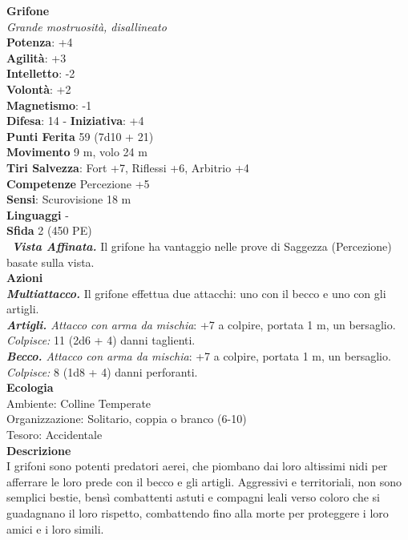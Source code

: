 \begin{multicols}{2}
\medskip\textbf{Grifone}\\
\emph{Grande mostruosità, disallineato}\\
\textbf{Potenza}: +4\\
\textbf{Agilità}: +3\\
\textbf{Intelletto}: -2\\
\textbf{Volontà}: +2\\
\textbf{Magnetismo}: -1\\
\textbf{Difesa}: 14 - \textbf{Iniziativa}: +4\\
\textbf{Punti Ferita} 59 (7d10 + 21)\\
\textbf{Movimento} 9 m, volo 24 m\\
\textbf{Tiri Salvezza}: Fort +7, Riflessi +6, Arbitrio +4\\
\textbf{Competenze} Percezione +5\\
\textbf{Sensi}: Scurovisione 18 m\\
\textbf{Linguaggi} -\\
\textbf{Sfida} 2 (450 PE)\smallskip\\\
\emph{\textbf{Vista Affinata.}} Il grifone ha vantaggio nelle prove di Saggezza (Percezione) basate sulla vista.\\
\smallskip\textbf{Azioni}\\
\emph{\textbf{Multiattacco.}} Il grifone effettua due attacchi: uno con il becco e uno con gli artigli.\\
\emph{\textbf{Artigli.} Attacco con arma da mischia}: +7 a colpire, portata 1 m, un bersaglio.\\
\emph{Colpisce:} 11 (2d6 + 4) danni taglienti.\\
\emph{\textbf{Becco.} Attacco con arma da mischia}: +7 a colpire, portata 1 m, un bersaglio.\\
\emph{Colpisce:} 8 (1d8 + 4) danni perforanti.\\
\textbf{Ecologia}\\
Ambiente: Colline Temperate\\
Organizzazione: Solitario, coppia o branco (6-10)\\
Tesoro: Accidentale\\
\textbf{Descrizione}\\
I grifoni sono potenti predatori aerei, che piombano dai loro altissimi nidi per afferrare le loro prede con il becco e gli artigli. Aggressivi e territoriali, non sono semplici bestie, bensì combattenti astuti e compagni leali verso coloro che si guadagnano il loro rispetto, combattendo fino alla morte per proteggere i loro amici e i loro simili.\\


\end{multicols}
